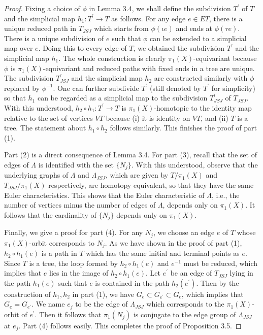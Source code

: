 \documentclass[11pt]{amsart}
\theoremstyle{plain}
\numberwithin{theorem}{section}
\theoremstyle{definition}
\begin{document}
\begin{proof}
Fixing a choice of $\phi$ in Lemma 3.4, we shall define the subdivision $T^\prime$ of $T$ and the
simplicial map $h_1: T^\prime\rightarrow T$ as follows. For any edge $e\in ET$, there is a unique
reduced path in $T_{JSJ}$ which starts from $\phi(\iota e)$ and ends at $\phi(\tau e)$. There is a
unique subdivision of $e$ such that $\phi$ can be extended to a simplicial map over $e$. Doing this 
to every edge of $T$, we obtained the subdivision $T^\prime$ and the simplicial map $h_1$. The whole construction is clearly $\pi_1(X)$-equivariant because $\phi$ is $\pi_1(X)$-equivariant and 
reduced paths with fixed ends in a tree are unique. The subdivision $T^\prime_{JSJ}$ and the simplicial map $h_2$ are constructed similarly with $\phi$ replaced by $\phi^{-1}$. One can further subdivide $T^\prime$ (still denoted by $T^\prime$ for simplicity) so that $h_1$ can be regarded 
as a simplicial map to the subdivision $T^\prime_{JSJ}$ of $T_{JSJ}$. With this understood, 
$h_2\circ h_1: T^\prime\rightarrow T$ is $\pi_1(X)$-homotopic to the identity map 
relative to the set of vertices $VT$ because (i) it is identity on $VT$, 
and (ii) $T$ is a tree. The statement about $h_1\circ h_2$ follows similarly. 
This finishes the proof of part (1). 

Part (2) is a direct consequence of Lemma 3.4.  For part (3), recall that the set of edges of 
$\Lambda$ is identified with the set $\{N_j\}$. With this understood, observe that the underlying graphs of $\Lambda$ and $\Lambda_{JSJ}$, which are given by $T/\pi_1(X)$ and 
$T_{JSJ}/\pi_1(X)$ respectively, are homotopy equivalent, so that they have the same Euler characteristics. This shows that the Euler characteristic of $\Lambda$, i.e., the number of vertices minus the number of edges of $\Lambda$, depends only on $\pi_1(X)$. It follows that the 
cardinality of $\{N_j\}$ depends only on $\pi_1(X)$.

Finally, we give a proof for part (4). For any $N_j$, we choose an edge $e$ of $T$ whose
$\pi_1(X)$-orbit corresponds to $N_j$. As we have shown in the proof of part (1), 
$h_2\circ h_1(e)$ is a path in $T$ which has the same initial and terminal points as $e$.
Since $T$ is a tree, the loop formed by $h_2\circ h_1(e)$ and $e^{-1}$ must be reduced,
which implies that $e$ lies in the image of $h_2\circ h_1(e)$. Let $e^\prime$ be an edge
of $T_{JSJ}$ lying in the path $h_1(e)$ such that $e$ is contained in the path $h_2(e^\prime)$.
Then by the construction of $h_1,h_2$ in part (1), we have 
$G_e\subset G_{e^\prime}\subset G_e$,
which implies that $G_e=G_{e^\prime}$. We name $e_j$ to be the edge of $\Lambda_{JSJ}$ 
which corresponds to the $\pi_1(X)$-orbit of $e^\prime$. Then it follows that $\pi_1(N_j)$ is 
conjugate to the edge group of $\Lambda_{JSJ}$ at $e_j$. Part (4) follows easily. 
This completes the proof of Proposition 3.5.

\end{proof}
\end{document}
